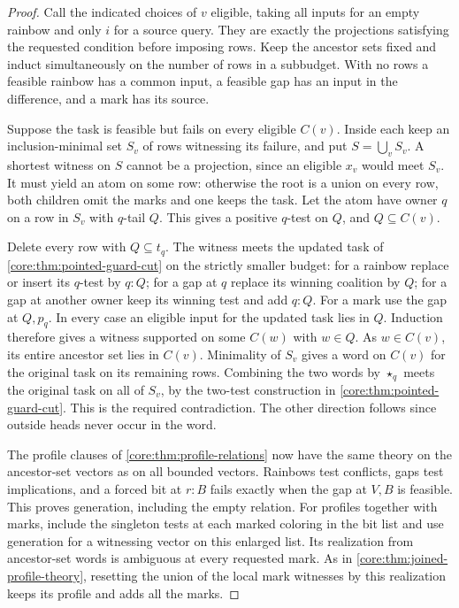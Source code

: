 \begin{proof}
Call the indicated choices of $v$ eligible, taking all inputs for an
empty rainbow and only $i$ for a source query. They are exactly the
projections satisfying the requested condition before imposing rows.
Keep the ancestor sets fixed and induct simultaneously on the number
of rows in a subbudget. With no rows a feasible rainbow has a common
input, a feasible gap has an input in the difference, and a mark
has its source.

Suppose the task is feasible but fails on every eligible $C(v)$.
Inside each keep an inclusion-minimal set $S_v$ of rows witnessing
its failure, and put $S=\bigcup_v S_v$. A shortest witness on $S$
cannot be a projection, since an eligible $x_v$ would meet $S_v$.
It must yield an atom on some row: otherwise the root is a union
on every row, both children omit the marks and one keeps the task.
Let the atom have owner $q$ on a row in $S_v$ with $q$-tail $Q$.
This gives a positive $q$-test on $Q$, and $Q\subseteq C(v)$.

Delete every row with $Q\subseteq t_q$. The witness meets the updated
task of \cref{core:thm:pointed-guard-cut} on the strictly smaller budget:
for a rainbow replace or insert its $q$-test by $q:Q$; for a gap at $q$
replace its winning coalition by $Q$; for a gap at another owner keep
its winning test and add $q:Q$. For a mark use the gap at $Q,p_q$.
In every case an eligible input for the updated task lies in $Q$.
Induction therefore gives a witness supported on some $C(w)$ with
$w\in Q$. As $w\in C(v)$, its entire ancestor set lies in $C(v)$.
Minimality of $S_v$ gives a word on $C(v)$ for the original task on
its remaining rows. Combining the two words by $\star_q$ meets the
original task on all of $S_v$, by the two-test construction in
\cref{core:thm:pointed-guard-cut}. This is the required contradiction.
The other direction follows since outside heads never occur in the word.

The profile clauses of \cref{core:thm:profile-relations} now have the
same theory on the ancestor-set vectors as on all bounded vectors.
Rainbows test conflicts, gaps test implications, and a forced bit at
$r:B$ fails exactly when the gap at $V,B$ is feasible. This proves
generation, including the empty relation. For profiles together with
marks, include the singleton tests at each marked coloring in the
bit list and use generation for a witnessing vector on this enlarged
list. Its realization from ancestor-set words is ambiguous at every
requested mark. As in \cref{core:thm:joined-profile-theory}, resetting
the union of the local mark witnesses by this realization keeps its
profile and adds all the marks.
\end{proof}

